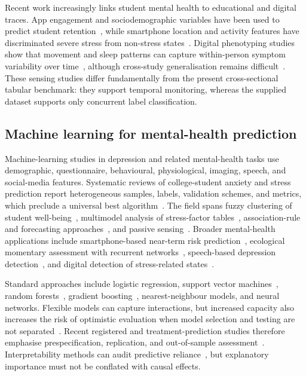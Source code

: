 \documentclass[review]{elsarticle}
\begin{document}
Recent work increasingly links student mental health to educational and digital traces. App engagement and sociodemographic variables have been used to predict student retention~\cite{matz2023}, while smartphone location and activity features have discriminated severe stress from non-stress states~\cite{shvetcov2024}. Digital phenotyping studies show that movement and sleep patterns can capture within-person symptom variability over time~\cite{price2023,montag2023}, although cross-study generalisation remains difficult~\cite{adler2022}. These sensing studies differ fundamentally from the present cross-sectional tabular benchmark: they support temporal monitoring, whereas the supplied dataset supports only concurrent label classification.

\subsection{Machine learning for mental-health prediction}
Machine-learning studies in depression and related mental-health tasks use demographic, questionnaire, behavioural, physiological, imaging, speech, and social-media features. Systematic reviews of college-student anxiety and stress prediction report heterogeneous samples, labels, validation schemes, and metrics, which preclude a universal best algorithm~\cite{daza2023,cruz2025,humayun2025}. The field spans fuzzy clustering of student well-being~\cite{han2023}, multimodel analysis of stress-factor tables~\cite{defilippis2024}, association-rule and forecasting approaches~\cite{fu2025}, and passive sensing~\cite{shvetcov2024}. Broader mental-health applications include smartphone-based near-term risk prediction~\cite{barrigon2023}, ecological momentary assessment with recurrent networks~\cite{choo2024}, speech-based depression detection~\cite{das2024}, and digital detection of stress-related states~\cite{carreiro2024}.

Standard approaches include logistic regression, support vector machines~\cite{cortes1995}, random forests~\cite{breiman2001}, gradient boosting~\cite{friedman2001}, nearest-neighbour models, and neural networks. Flexible models can capture interactions, but increased capacity also increases the risk of optimistic evaluation when model selection and testing are not separated~\cite{varma2006}. Recent registered and treatment-prediction studies therefore emphasise prespecification, replication, and out-of-sample assessment~\cite{jankowsky2024,hammelrath2024,harrer2023}. Interpretability methods can audit predictive reliance~\cite{lundberg2017}, but explanatory importance must not be conflated with causal effects.
\end{document}
